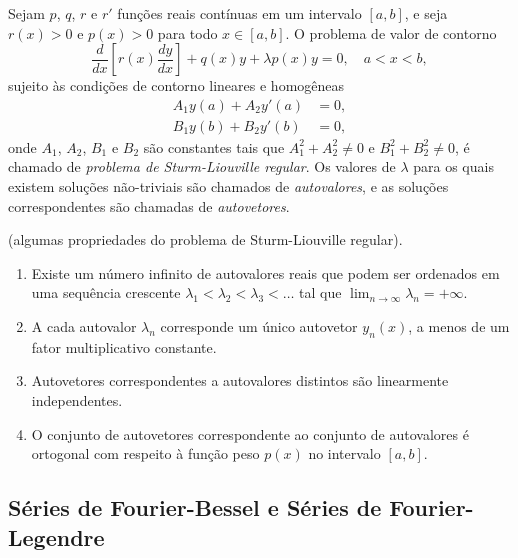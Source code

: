 \documentclass{article}
\begin{document}
\begin{defn}
    Sejam \(p\), \(q\), \(r\) e \(r'\) funções reais contínuas em um intervalo \([a,b]\), e seja \(r(x)>0\) e \(p(x)>0\) para todo \(x \in [a,b]\). O problema de valor de contorno
    \begin{equation}
        \frac{d}{dx}\left[r(x)\frac{dy}{dx}\right] + q(x)y + \lambda p(x)y = 0, \quad a < x < b,
    \end{equation}
    \noindent sujeito às condições de contorno lineares e homogêneas
    \begin{align}
        A_1 y(a) + A_2 y'(a) &= 0, \\
        B_1 y(b) + B_2 y'(b) &= 0,
    \end{align}
    \noindent onde \(A_1\), \(A_2\), \(B_1\) e \(B_2\) são constantes tais que \(A_1^2 + A_2^2 \neq 0\) e \(B_1^2 + B_2^2 \neq 0\), é chamado de \emph{problema de Sturm-Liouville regular}. Os valores de \(\lambda\) para os quais existem soluções não-triviais são chamados de \emph{autovalores}, e as soluções correspondentes são chamadas de \emph{autovetores}.
\end{defn}

\begin{thm} (algumas propriedades do problema de Sturm-Liouville regular).
    \begin{enumerate}
        \item[\textup{(a)}] Existe um número infinito de autovalores reais que podem ser ordenados em uma sequência crescente \( \lambda_1 < \lambda_2 < \lambda_3 < \ldots \) tal que \( \lim_{n \to \infty} \lambda_n = +\infty \).
        \item[\textup{(b)}] A cada autovalor \( \lambda_n \) corresponde um único autovetor \( y_n(x) \), a menos de um fator multiplicativo constante.
        \item[\textup{(c)}] Autovetores correspondentes a autovalores distintos são linearmente independentes.
        \item[\textup{(d)}] O conjunto de autovetores correspondente ao conjunto de autovalores é ortogonal com respeito à função peso \( p(x) \) no intervalo \([a,b]\).
    \end{enumerate}
\end{thm}

\subsection{Séries de Fourier-Bessel e Séries de Fourier-Legendre}
\end{document}
